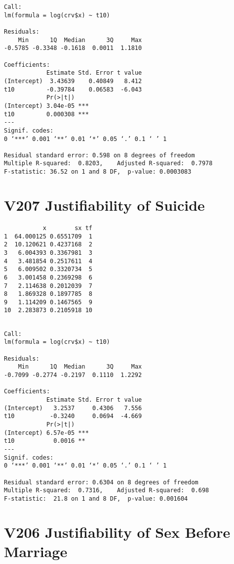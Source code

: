 \documentclass{amsart}
\begin{document}
\begin{verbatim}
Call:
lm(formula = log(crv$x) ~ t10)

Residuals:
    Min      1Q  Median      3Q     Max 
-0.5785 -0.3348 -0.1618  0.0011  1.1810 

Coefficients:
            Estimate Std. Error t value
(Intercept)  3.43639    0.40849   8.412
t10         -0.39784    0.06583  -6.043
            Pr(>|t|)    
(Intercept) 3.04e-05 ***
t10         0.000308 ***
---
Signif. codes:  
0 ‘***’ 0.001 ‘**’ 0.01 ‘*’ 0.05 ‘.’ 0.1 ‘ ’ 1

Residual standard error: 0.598 on 8 degrees of freedom
Multiple R-squared:  0.8203,	Adjusted R-squared:  0.7978 
F-statistic: 36.52 on 1 and 8 DF,  p-value: 0.0003083
\end{verbatim}


\section{V207 Justifiability of Suicide}

\begin{verbatim}
           x        sx tf
1  64.000125 0.6551709  1
2  10.120621 0.4237168  2
3   6.004393 0.3367981  3
4   3.481854 0.2517611  4
5   6.009502 0.3320734  5
6   3.001458 0.2369298  6
7   2.114638 0.2012039  7
8   1.869328 0.1897785  8
9   1.114209 0.1467565  9
10  2.283873 0.2105918 10
\end{verbatim}


\begin{verbatim}

Call:
lm(formula = log(crv$x) ~ t10)

Residuals:
    Min      1Q  Median      3Q     Max 
-0.7099 -0.2774 -0.2197  0.1110  1.2292 

Coefficients:
            Estimate Std. Error t value
(Intercept)   3.2537     0.4306   7.556
t10          -0.3240     0.0694  -4.669
            Pr(>|t|)    
(Intercept) 6.57e-05 ***
t10           0.0016 ** 
---
Signif. codes:  
0 ‘***’ 0.001 ‘**’ 0.01 ‘*’ 0.05 ‘.’ 0.1 ‘ ’ 1

Residual standard error: 0.6304 on 8 degrees of freedom
Multiple R-squared:  0.7316,	Adjusted R-squared:  0.698 
F-statistic:  21.8 on 1 and 8 DF,  p-value: 0.001604
\end{verbatim}

\section{V206 Justifiability of Sex Before Marriage}
\end{document}
